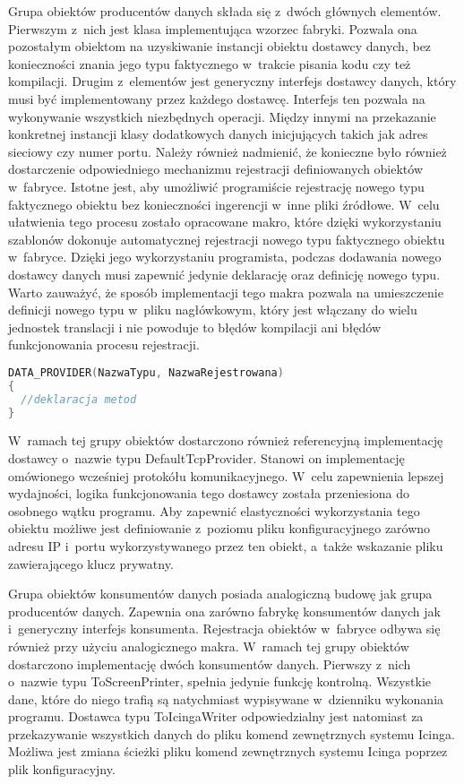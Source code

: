 Grupa obiektów producentów danych składa się z~dwóch głównych
elementów. Pierwszym z~nich jest klasa implementująca wzorzec
fabryki. Pozwala ona pozostałym obiektom na uzyskiwanie instancji
obiektu dostawcy danych, bez konieczności znania jego typu faktycznego
w~trakcie pisania kodu czy też kompilacji. Drugim z~elementów jest
generyczny interfejs dostawcy danych, który musi być implementowany
przez każdego dostawcę. Interfejs ten pozwala na wykonywanie
wszystkich niezbędnych operacji. Między innymi na przekazanie
konkretnej instancji klasy dodatkowych danych inicjujących takich jak
adres sieciowy czy numer portu. Należy również nadmienić, że konieczne
było również dostarczenie odpowiedniego mechanizmu rejestracji
definiowanych obiektów w~fabryce. Istotne jest, aby umożliwić
programiście rejestrację nowego typu faktycznego obiektu bez
konieczności ingerencji w~inne pliki źródłowe. W~celu ułatwienia tego
procesu zostało opracowane makro, które dzięki wykorzystaniu szablonów
dokonuje automatycznej rejestracji nowego typu faktycznego obiektu
w~fabryce. Dzięki jego wykorzystaniu programista, podczas dodawania
nowego dostawcy danych musi zapewnić jedynie deklarację oraz definicję
nowego typu. Warto zauważyć, że sposób implementacji tego makra
pozwala na umieszczenie definicji nowego typu w~pliku nagłówkowym,
który jest włączany do wielu jednostek translacji i nie powoduje to
błędów kompilacji ani błędów funkcjonowania procesu rejestracji.

\vspace{0.5cm}
\begin{minipage}{\textwidth}
\begin{lstlisting}[language=c++, caption=Definicja dostawcy danych]
DATA_PROVIDER(NazwaTypu, NazwaRejestrowana)
{
  //deklaracja metod
}
\end{lstlisting}
\end{minipage}
\vspace{0.5cm}

W~ramach tej grupy obiektów dostarczono również referencyjną
implementację dostawcy o~nazwie typu DefaultTcpProvider. Stanowi on
implementację omówionego wcześniej protokółu komunikacyjnego. W~celu
zapewnienia lepszej wydajności, logika funkcjonowania tego dostawcy
została przeniesiona do osobnego wątku programu. Aby zapewnić
elastyczności wykorzystania tego obiektu możliwe jest definiowanie
z~poziomu pliku konfiguracyjnego zarówno adresu IP i~portu
wykorzystywanego przez ten obiekt, a~także wskazanie pliku
zawierającego klucz prywatny.

Grupa obiektów konsumentów danych posiada analogiczną budowę jak grupa
producentów danych. Zapewnia ona zarówno fabrykę konsumentów danych
jak i~generyczny interfejs konsumenta. Rejestracja obiektów w~fabryce
odbywa się również przy użyciu analogicznego makra. W~ramach tej grupy
obiektów dostarczono implementację dwóch konsumentów danych. Pierwszy
z~nich o~nazwie typu ToScreenPrinter, spełnia jedynie funkcję
kontrolną. Wszystkie dane, które do niego trafią są natychmiast
wypisywane w~dzienniku wykonania programu. Dostawca typu
ToIcingaWriter odpowiedzialny jest natomiast za przekazywanie
wszystkich danych do pliku komend zewnętrznych systemu Icinga. Możliwa
jest zmiana ścieżki pliku komend zewnętrznych systemu Icinga poprzez
plik konfiguracyjny.

